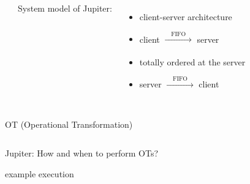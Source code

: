 
\begin{frame}{}
  \centerline{\Huge {}}
\end{frame}

\begin{frame}{}
  \begin{columns}
      \begin{center}
	
      \end{center}
      System model of Jupiter: \\[5pt]
      \begin{itemize}
	\setlength{\itemsep}{10pt}
	\item<1-> client-server architecture
	\item<2-> client $\xrightarrow[]{\quad \text{FIFO} \quad}$ server
	\item<3-> totally ordered at the server
	\item<4-> server $\xrightarrow[]{\quad \text{FIFO} \quad}$ client
      \end{itemize}
  \end{columns}
\end{frame}

\begin{frame}{}
  \centerline{OT (Operational Transformation)~\cite{}}

  \pause
  \begin{columns}
      \begin{center}
	
      \end{center}
      \begin{center}
	
      \end{center}
  \end{columns}
\end{frame}

\begin{frame}{}
  \centerline{\large Jupiter: How and when to perform OTs?}

\end{frame}

\begin{frame}{}
  example execution
\end{frame}
